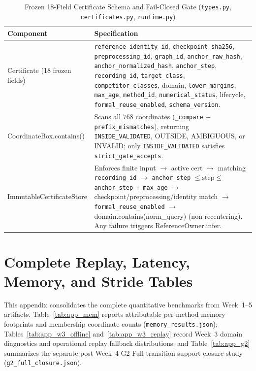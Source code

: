 \documentclass[11pt,oneside,a4paper]{report}
\newcommand{\code}[1]{{\small\upshape\ttfamily #1}}
\newcommand{\pathcode}[1]{{\small\upshape\ttfamily\nolinkurl{#1}}}
\theoremstyle{remark}
\begin{document}
\begin{table}[htbp]
\centering\small
\caption{Frozen 18-Field \code{Certificate} Schema and Fail-Closed Gate (\nolinkurl{types.py}, \nolinkurl{certificates.py}, \nolinkurl{runtime.py})}
\label{tab:alg_cert}
\begin{tabularx}{\textwidth}{@{}P{4.55cm}Y@{}}
\toprule
\textbf{Component} & \textbf{Specification} \\
\midrule
\code{Certificate} (18 frozen fields) & \pathcode{reference_identity_id}, \pathcode{checkpoint_sha256}, \pathcode{preprocessing_id}, \pathcode{graph_id}, \pathcode{anchor_raw_hash}, \pathcode{anchor_normalized_hash}, \pathcode{anchor_step}, \pathcode{recording_id}, \pathcode{target_class}, \pathcode{competitor_classes}, \code{domain}, \pathcode{lower_margins}, \pathcode{max_age}, \pathcode{method_id}, \pathcode{numerical_status}, \code{lifecycle}, \pathcode{formal_reuse_enabled}, \pathcode{schema_version}. \\
\code{CoordinateBox.contains()} & Scans all $768$ coordinates (\pathcode{_compare} + \pathcode{prefix_mismatches}), returning \pathcode{INSIDE_VALIDATED}, \code{OUTSIDE}, \code{AMBIGUOUS}, or \code{INVALID}; only \pathcode{INSIDE_VALIDATED} satisfies \pathcode{strict_gate_accepts}. \\
\code{ImmutableCertificateStore} & Enforces finite input $\to$ active cert $\to$ matching \pathcode{recording_id} $\to$ \pathcode{anchor_step} $\le \text{step} \le$ \pathcode{anchor_step} + \pathcode{max_age} $\to$ checkpoint/preprocessing/identity match $\to$ \pathcode{formal_reuse_enabled} $\to$ \code{domain.contains(norm\_query)} (non-recentering). Any failure triggers \code{ReferenceOwner.infer}. \\
\bottomrule
\end{tabularx}
\end{table}

\chapter{Complete Replay, Latency, Memory, and Stride Tables}
\label{app:tables}

This appendix consolidates the complete quantitative benchmarks from Week~1--5 artifacts. Table~\ref{tab:app_mem} reports attributable per-method memory footprints and membership coordinate counts (\pathcode{memory_results.json}); Tables~\ref{tab:app_w3_offline} and~\ref{tab:app_w3_replay} record Week~3 domain diagnostics and operational replay fallback distributions; and Table~\ref{tab:app_g2} summarizes the separate post-Week~4 \code{G2-Full} transition-support closure study (\pathcode{g2_full_closure.json}).
\end{document}
